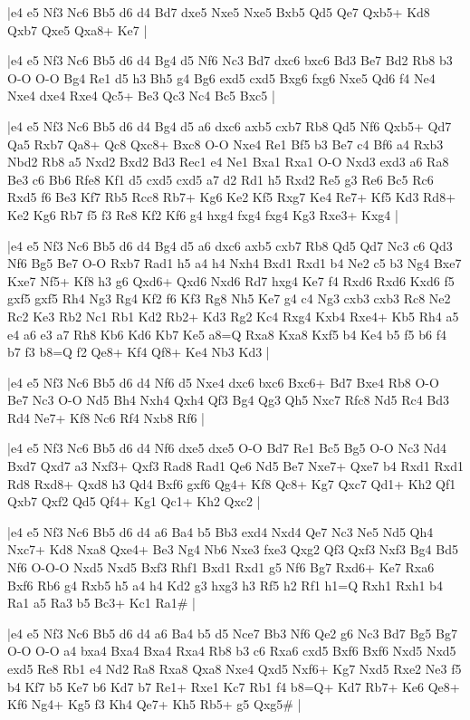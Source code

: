 \whitename{}
\blackname{}
\makegametitle
|e4 e5 Nf3 Nc6 Bb5 d6 d4 Bd7 dxe5 Nxe5 Nxe5 Bxb5 Qd5 Qe7 Qxb5+ Kd8 Qxb7 Qxe5 Qxa8+ Ke7  |

\whitename{}
\blackname{}
\makegametitle
|e4 e5 Nf3 Nc6 Bb5 d6 d4 Bg4 d5 Nf6 Nc3 Bd7 dxc6 bxc6 Bd3 Be7 Bd2 Rb8 b3 O-O O-O Bg4 Re1 d5 h3 Bh5 g4 Bg6 exd5 cxd5 Bxg6 fxg6 Nxe5 Qd6 f4 Ne4 Nxe4 dxe4 Rxe4 Qc5+ Be3 Qc3 Nc4 Bc5 Bxc5  |

\whitename{}
\blackname{}
\makegametitle
|e4 e5 Nf3 Nc6 Bb5 d6 d4 Bg4 d5 a6 dxc6 axb5 cxb7 Rb8 Qd5 Nf6 Qxb5+ Qd7 Qa5 Rxb7 Qa8+ Qc8 Qxc8+ Bxc8 O-O Nxe4 Re1 Bf5 b3 Be7 c4 Bf6 a4 Rxb3 Nbd2 Rb8 a5 Nxd2 Bxd2 Bd3 Rec1 e4 Ne1 Bxa1 Rxa1 O-O Nxd3 exd3 a6 Ra8 Be3 c6 Bb6 Rfe8 Kf1 d5 cxd5 cxd5 a7 d2 Rd1 h5 Rxd2 Re5 g3 Re6 Bc5 Rc6 Rxd5 f6 Be3 Kf7 Rb5 Rcc8 Rb7+ Kg6 Ke2 Kf5 Rxg7 Ke4 Re7+ Kf5 Kd3 Rd8+ Ke2 Kg6 Rb7 f5 f3 Re8 Kf2 Kf6 g4 hxg4 fxg4 fxg4 Kg3 Rxe3+ Kxg4  |

\whitename{}
\blackname{}
\makegametitle
|e4 e5 Nf3 Nc6 Bb5 d6 d4 Bg4 d5 a6 dxc6 axb5 cxb7 Rb8 Qd5 Qd7 Nc3 c6 Qd3 Nf6 Bg5 Be7 O-O Rxb7 Rad1 h5 a4 h4 Nxh4 Bxd1 Rxd1 b4 Ne2 c5 b3 Ng4 Bxe7 Kxe7 Nf5+ Kf8 h3 g6 Qxd6+ Qxd6 Nxd6 Rd7 hxg4 Ke7 f4 Rxd6 Rxd6 Kxd6 f5 gxf5 gxf5 Rh4 Ng3 Rg4 Kf2 f6 Kf3 Rg8 Nh5 Ke7 g4 c4 Ng3 cxb3 cxb3 Rc8 Ne2 Rc2 Ke3 Rb2 Nc1 Rb1 Kd2 Rb2+ Kd3 Rg2 Kc4 Rxg4 Kxb4 Rxe4+ Kb5 Rh4 a5 e4 a6 e3 a7 Rh8 Kb6 Kd6 Kb7 Ke5 a8=Q Rxa8 Kxa8 Kxf5 b4 Ke4 b5 f5 b6 f4 b7 f3 b8=Q f2 Qe8+ Kf4 Qf8+ Ke4 Nb3 Kd3  |

\whitename{}
\blackname{}
\makegametitle
|e4 e5 Nf3 Nc6 Bb5 d6 d4 Nf6 d5 Nxe4 dxc6 bxc6 Bxc6+ Bd7 Bxe4 Rb8 O-O Be7 Nc3 O-O Nd5 Bh4 Nxh4 Qxh4 Qf3 Bg4 Qg3 Qh5 Nxc7 Rfc8 Nd5 Rc4 Bd3 Rd4 Ne7+ Kf8 Nc6 Rf4 Nxb8 Rf6  |

\whitename{}
\blackname{}
\makegametitle
|e4 e5 Nf3 Nc6 Bb5 d6 d4 Nf6 dxe5 dxe5 O-O Bd7 Re1 Bc5 Bg5 O-O Nc3 Nd4 Bxd7 Qxd7 a3 Nxf3+ Qxf3 Rad8 Rad1 Qe6 Nd5 Be7 Nxe7+ Qxe7 b4 Rxd1 Rxd1 Rd8 Rxd8+ Qxd8 h3 Qd4 Bxf6 gxf6 Qg4+ Kf8 Qc8+ Kg7 Qxc7 Qd1+ Kh2 Qf1 Qxb7 Qxf2 Qd5 Qf4+ Kg1 Qc1+ Kh2 Qxc2  |

\whitename{}
\blackname{}
\makegametitle
|e4 e5 Nf3 Nc6 Bb5 d6 d4 a6 Ba4 b5 Bb3 exd4 Nxd4 Qe7 Nc3 Ne5 Nd5 Qh4 Nxc7+ Kd8 Nxa8 Qxe4+ Be3 Ng4 Nb6 Nxe3 fxe3 Qxg2 Qf3 Qxf3 Nxf3 Bg4 Bd5 Nf6 O-O-O Nxd5 Nxd5 Bxf3 Rhf1 Bxd1 Rxd1 g5 Nf6 Bg7 Rxd6+ Ke7 Rxa6 Bxf6 Rb6 g4 Rxb5 h5 a4 h4 Kd2 g3 hxg3 h3 Rf5 h2 Rf1 h1=Q Rxh1 Rxh1 b4 Ra1 a5 Ra3 b5 Bc3+ Kc1 Ra1\#  |

\whitename{}
\blackname{}
\makegametitle
|e4 e5 Nf3 Nc6 Bb5 d6 d4 a6 Ba4 b5 d5 Nce7 Bb3 Nf6 Qe2 g6 Nc3 Bd7 Bg5 Bg7 O-O O-O a4 bxa4 Bxa4 Bxa4 Rxa4 Rb8 b3 c6 Rxa6 cxd5 Bxf6 Bxf6 Nxd5 Nxd5 exd5 Re8 Rb1 e4 Nd2 Ra8 Rxa8 Qxa8 Nxe4 Qxd5 Nxf6+ Kg7 Nxd5 Rxe2 Ne3 f5 b4 Kf7 b5 Ke7 b6 Kd7 b7 Re1+ Rxe1 Kc7 Rb1 f4 b8=Q+ Kd7 Rb7+ Ke6 Qe8+ Kf6 Ng4+ Kg5 f3 Kh4 Qe7+ Kh5 Rb5+ g5 Qxg5\#  |

